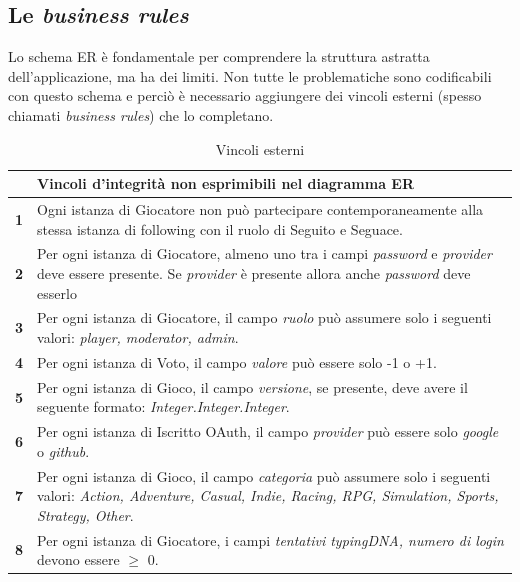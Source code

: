 \FloatBarrier
\subsection{Le \emph{business rules}}
Lo schema ER è fondamentale per comprendere la struttura astratta dell'applicazione, ma ha dei limiti. Non tutte le problematiche sono codificabili con questo schema e perciò è necessario aggiungere dei vincoli esterni (spesso chiamati \emph{business rules}) che lo completano.

\begin{table}[hbt!]
    \begin{tabular}{p{1cm} m{}}
        \hline
        & \textbf{Vincoli d'integrità non esprimibili nel diagramma ER} \\
        \hline 
        \textbf{1} & Ogni istanza di Giocatore non può partecipare contemporaneamente alla stessa istanza di following con il ruolo di Seguito e Seguace. \\ \hline
        \textbf{2} & Per ogni istanza di Giocatore, almeno uno tra i campi \emph{password} e \emph{provider} deve essere presente. Se \emph{provider} è presente allora anche \emph{password} deve esserlo \\ \hline
        \textbf{3} & Per ogni istanza di Giocatore, il campo \emph{ruolo} può assumere solo i seguenti valori: \emph{player, moderator, admin}. \\ \hline
        \textbf{4} & Per ogni istanza di Voto, il campo \emph{valore} può essere solo -1 o +1. \\ \hline
        \textbf{5} & Per ogni istanza di Gioco, il campo \emph{versione}, se presente, deve avere il seguente formato: \emph{Integer.Integer.Integer}. \\ \hline
        \textbf{6} & Per ogni istanza di Iscritto OAuth, il campo \emph{provider} può essere solo \emph{google} o \emph{github}. \\ \hline
        \textbf{7} & Per ogni istanza di Gioco, il campo \emph{categoria} può assumere solo i seguenti valori: \emph{Action, Adventure, Casual, Indie, Racing, RPG, Simulation, Sports, Strategy, Other}. \\ \hline
        \textbf{8} & Per ogni istanza di Giocatore, i campi \emph{tentativi typingDNA, numero di login} devono essere $\geq$ 0. \\
    \end{tabular}
    \caption{Vincoli esterni}
\end{table}